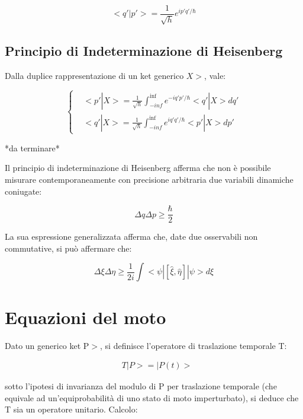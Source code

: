 \documentclass{article}
\begin{document}
\begin{equation}
    <q'|p'>= \frac{1}{\sqrt{h}}e^{ip'q'/\hbar}
\end{equation}



\subsection{Principio di Indeterminazione di Heisenberg}
Dalla duplice rappresentazione di un ket generico $X>$, vale:

\begin{equation}
    \left \{
    \begin{aligned}
    & <p'|X>= \frac{1}{\sqrt{h}} \int_{-inf}^{\inf} e^{-iq'p'/\hbar} <q' |X> dq' \\
    & <q'|X>= \frac{1}{\sqrt{h}} \int_{-inf}^{\inf} e^{iq'q'/\hbar} <p' |X> dp'
    \end{aligned}
    \right.
\end{equation}

*da terminare*

Il principio di indeterminazione di Heisenberg afferma che non è possibile misurare contemporaneamente con precisione arbitraria due variabili dinamiche coniugate:

\begin{equation}
    \Delta q \Delta p \geq \frac{\hbar}{2}
\end{equation}

La sua espressione generalizzata afferma che, date due osservabili non commutative, si può affermare che:

\begin{equation}
    \Delta \xi \Delta \eta \geq \frac{1}{2i}\int <\psi|[\hat{\xi},\hat{\eta}]|\psi>d\xi
\end{equation}


\section{Equazioni del moto}
Dato un generico ket P$>$, si definisce l'operatore di traslazione temporale T:

\begin{equation}
    \begin{aligned}
    & T |P>= |P(t)>
    \end{aligned}
\end{equation}

sotto l'ipotesi di invarianza del modulo di P per traslazione temporale (che equivale ad un'equiprobabilità di uno stato di moto imperturbato),
si deduce che T sia un operatore unitario.
Calcolo:
\end{document}
